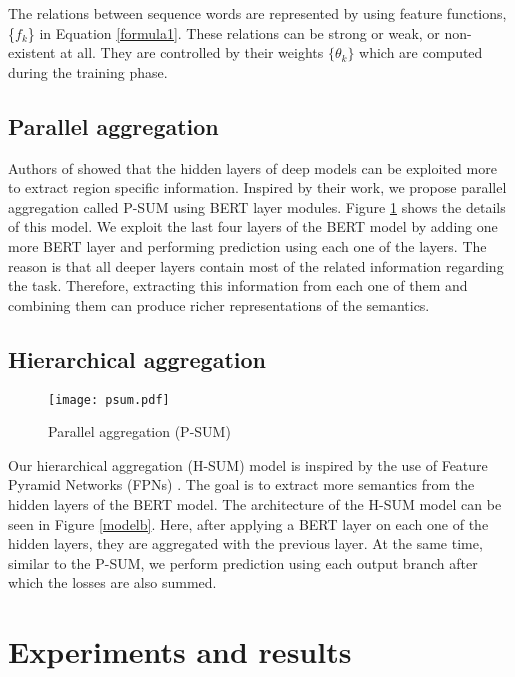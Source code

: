 \documentclass{article}
\begin{document}
The relations between sequence words are represented by using feature functions, \{$f_k$\} in Equation \ref{formula1}. These relations can be strong or weak, or non-existent at all. They are controlled by their weights $\{\theta_k\}$ which are computed during the training phase. 

\subsection{Parallel aggregation}
Authors of \cite{rossi2020novel} showed that the hidden layers of deep models can be exploited more to extract region specific information. Inspired by their work, we propose parallel aggregation called P-SUM using BERT layer modules. Figure \ref{modela} shows the details of this model. We exploit the last four layers of the BERT model by adding one more BERT layer and performing prediction using each one of the layers. The reason is that all deeper layers contain most of the related information regarding the task. Therefore, extracting this information from each one of them and combining them can produce richer representations of the semantics. 

\subsection{Hierarchical aggregation}

\begin{figure}
	\begin{center}
		\texttt{[image: psum.pdf]}
		\caption{Parallel aggregation (P-SUM)}
		\label{modela}
	\end{center}
\end{figure}

Our hierarchical aggregation (H-SUM) model is inspired by the use of Feature Pyramid Networks (FPNs) \cite{lin2017feature}. The goal is to extract more semantics from the hidden layers of the BERT model. The architecture of the H-SUM model can be seen in Figure \ref{modelb}. Here, after applying a BERT layer on each one of the hidden layers, they are aggregated with the previous layer. At the same time, similar to the P-SUM, we perform prediction using each output branch after which the losses are also summed. 

\section{Experiments and results}
\end{document}
